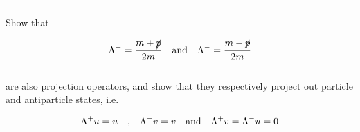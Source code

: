 \noindent\rule{7in}{1.5pt}


\begin{problem}{6.3}
    Show that

    \begin{align*}
        \Lambda^+ = \frac{m+\slashed{p}}{2m} \quad \text{and} \quad \Lambda^- = \frac{m-\slashed{p}}{2m}
    \end{align*}\\
    are also projection operators, and show that they respectively project out particle and antiparticle states, i.e.

    \begin{align*}
        \Lambda^+ u = u \quad \text{,} \quad \Lambda^- v = v \quad \text{and} \quad \Lambda^+ v = \Lambda^- u = 0 \\
    \end{align*}
\end{problem}

